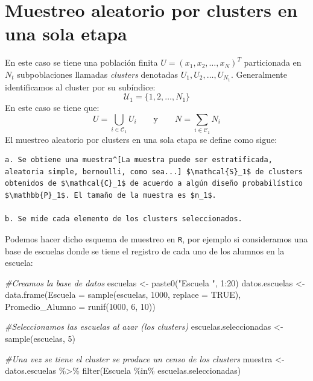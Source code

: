 \documentclass[
]{book}
\newenvironment{Shaded}{\begin{snugshade}}{\end{snugshade}}
\newcommand{\AttributeTok}[1]{\textcolor[rgb]{0.77,0.63,0.00}{#1}}
\newcommand{\CommentTok}[1]{\textcolor[rgb]{0.56,0.35,0.01}{\textit{#1}}}
\newcommand{\ConstantTok}[1]{\textcolor[rgb]{0.00,0.00,0.00}{#1}}
\newcommand{\DecValTok}[1]{\textcolor[rgb]{0.00,0.00,0.81}{#1}}
\newcommand{\FunctionTok}[1]{\textcolor[rgb]{0.00,0.00,0.00}{#1}}
\newcommand{\NormalTok}[1]{#1}
\newcommand{\OtherTok}[1]{\textcolor[rgb]{0.56,0.35,0.01}{#1}}
\newcommand{\SpecialCharTok}[1]{\textcolor[rgb]{0.00,0.00,0.00}{#1}}
\newcommand{\StringTok}[1]{\textcolor[rgb]{0.31,0.60,0.02}{#1}}
\begin{document}
\hypertarget{muestreo-aleatorio-por-clusters-en-una-sola-etapa}{%
\section{Muestreo aleatorio por clusters en una sola etapa}\label{muestreo-aleatorio-por-clusters-en-una-sola-etapa}}

En este caso se tiene una población finita \(U = (x_1, x_2, \dots, x_N)^T\) particionada en \(N_t\) subpoblaciones llamadas \emph{clusters} denotadas \(U_1, U_2, \dots, U_{N_1}\). Generalmente identificamos al cluster por su subíndice:
\[
\mathcal{U}_1 = \{ 1, 2, \dots, N_1\}
\]
En este caso se tiene que:
\[
U = \bigcup_{i \in \mathcal{C}_1} U_i \qquad \text{y} \qquad N = \sum\limits_{i \in \mathcal{C}_1} N_i
\]
El muestreo aleatorio por clusters en una sola etapa se define como sigue:

\begin{verbatim}
a. Se obtiene una muestra^[La muestra puede ser estratificada, aleatoria simple, bernoulli, como sea...] $\mathcal{S}_1$ de clusters obtenidos de $\mathcal{C}_1$ de acuerdo a algún diseño probabilístico $\mathbb{P}_1$. El tamaño de la muestra es $n_1$. 

b. Se mide cada elemento de los clusters seleccionados. 
\end{verbatim}

Podemos hacer dicho esquema de muestreo en \texttt{R}, por ejemplo si consideramos una base de escuelas donde se tiene el registro de cada uno de los alumnos en la escuela:

\begin{Shaded}
\begin{Highlighting}[]
\CommentTok{\#Creamos la base de datos}
\NormalTok{escuelas       }\OtherTok{\textless{}{-}} \FunctionTok{paste0}\NormalTok{(}\StringTok{"Escuela "}\NormalTok{, }\DecValTok{1}\SpecialCharTok{:}\DecValTok{20}\NormalTok{)}
\NormalTok{datos.escuelas }\OtherTok{\textless{}{-}} \FunctionTok{data.frame}\NormalTok{(}\AttributeTok{Escuela =} \FunctionTok{sample}\NormalTok{(escuelas, }\DecValTok{1000}\NormalTok{, }\AttributeTok{replace =} \ConstantTok{TRUE}\NormalTok{), }
                             \AttributeTok{Promedio\_Alumno =} \FunctionTok{runif}\NormalTok{(}\DecValTok{1000}\NormalTok{, }\DecValTok{6}\NormalTok{, }\DecValTok{10}\NormalTok{))}

\CommentTok{\#Seleccionamos las escuelas al azar (los clusters)}
\NormalTok{escuelas.seleccionadas }\OtherTok{\textless{}{-}} \FunctionTok{sample}\NormalTok{(escuelas, }\DecValTok{5}\NormalTok{)}

\CommentTok{\#Una vez se tiene el cluster se produce un censo de los clusters}
\NormalTok{muestra }\OtherTok{\textless{}{-}}\NormalTok{ datos.escuelas }\SpecialCharTok{\%\textgreater{}\%} \FunctionTok{filter}\NormalTok{(Escuela }\SpecialCharTok{\%in\%}\NormalTok{ escuelas.seleccionadas)}
\end{Highlighting}
\end{Shaded}
\end{document}
